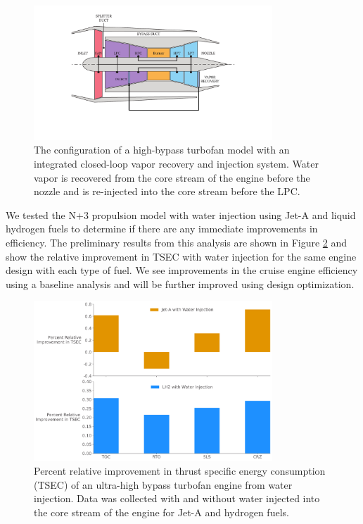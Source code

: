 \documentclass[conf]{new-aiaa}
\begin{document}
\begin{figure}[H]
	\centering
	\includegraphics[width=0.8\textwidth]{turbofan_wvr.pdf}
	\caption{The configuration of a high-bypass turbofan model with an integrated closed-loop vapor recovery and injection system.
		Water vapor is recovered from the core stream of the engine before the nozzle and is re-injected into the core stream before the LPC.}
	\label{fig:hbtf_cycle}
\end{figure}

We tested the N+3 propulsion model with water injection using Jet-A and liquid hydrogen fuels to determine if there are any immediate improvements in efficiency.
The preliminary results from this analysis are shown in Figure \ref{fig:results} and show the relative improvement in TSEC with water injection for the same engine design with each type of fuel.
We see improvements in the cruise engine efficiency using a baseline analysis and will be further improved using design optimization.

\begin{figure}[H]
	\centering
	\includegraphics[width=0.8\textwidth]{JetA-H2_bar_chart_diff.pdf}
	\caption{Percent relative improvement in thrust specific energy consumption (TSEC) of an ultra-high bypass turbofan engine from water injection.
		Data was collected with and without water injected into the core stream of the engine for Jet-A and hydrogen fuels.}
	\label{fig:results}
\end{figure}
\end{document}
